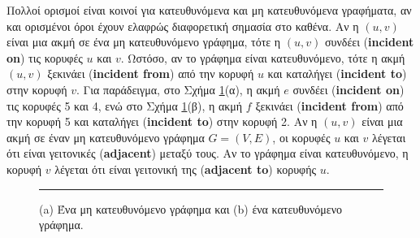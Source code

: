 \documentclass[12pt,a4paper]{article} %
\begin{document}
Πολλοί ορισμοί είναι κοινοί για κατευθυνόμενα και μη κατευθυνόμενα γραφήματα, αν και ορισμένοι όροι έχουν ελαφρώς διαφορετική σημασία στο καθένα.
Αν η $(u, v)$ είναι μια ακμή σε ένα μη κατευθυνόμενο γράφημα, τότε η $(u, v)$ συνδέει (\textbf{incident on}) τις κορυφές $u$ και $v$.
Ωστόσο, αν το γράφημα είναι κατευθυνόμενο, τότε η ακμή $(u, v)$ ξεκινάει (\textbf{incident from}) από την κορυφή $u$ και καταλήγει (\textbf{incident to}) στην κορυφή $v$.
Για παράδειγμα, στο Σχήμα \ref{fig:graph1}(α), η ακμή $e$ συνδέει (\textbf{incident on}) τις κορυφές 5 και 4, ενώ στο Σχήμα \ref{fig:graph1}(β), η ακμή $f$ ξεκινάει (\textbf{incident from}) από την κορυφή 5 και καταλήγει (\textbf{incident to}) στην κορυφή 2.
Αν η $(u, v)$ είναι μια ακμή σε έναν μη κατευθυνόμενο γράφημα $G = (V, E)$, οι κορυφές $u$ και $v$ λέγεται ότι είναι γειτονικές (\textbf{adjacent}) μεταξύ τους.
Αν το γράφημα είναι κατευθυνόμενο, η κορυφή $v$ λέγεται ότι είναι γειτονική της (\textbf{adjacent to}) κορυφής $u$.



\begin{figure}[ht]
\centering

\begin{minipage}{0.45\textwidth}
\centering
{}
\end{minipage}
\hfill
\begin{minipage}{0.45\textwidth}
\centering
{}
\end{minipage}

\vspace{0.3cm}
\noindent\rule{\textwidth}{0.2pt}
\caption{(a) Ένα μη κατευθυνόμενο γράφημα και (b) ένα κατευθυνόμενο γράφημα.}
\label{fig:graph1}
\end{figure}
\vspace{0.5cm}
\end{document}
